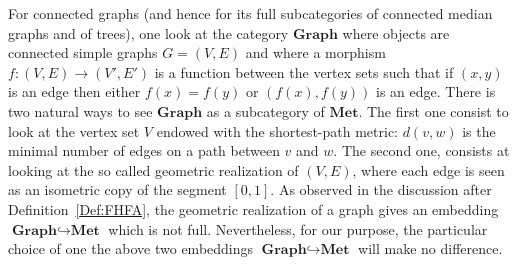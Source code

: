\documentclass[a4paper]{article}
\theoremstyle{definition}
\DeclareMathOperator\Aut{Aut}
\newcommand*{\field}[1]{\mathbf{#1}}
\newcommand*{\category}[1]{\textbf{#1}}
\newcommand*{\Z}{\field{Z}}
\newcommand*{\R}{\field{R}}
\begin{document}
For connected graphs (and hence for its full subcategories of connected median graphs and of trees), one look at the category $\category{Graph}$ where objects are connected simple graphs $G=(V,E)$ and where a morphism $f\colon (V,E)\to(V',E')$ is a function between the vertex sets such that if $(x,y)$ is an edge then either $f(x)=f(y)$ or $(f(x),f(y))$ is an edge.
There is two natural ways to see $\category{Graph}$ as a subcategory of $\category{Met}$.
The first one consist to look at the vertex set $V$ endowed with the shortest-path metric: $d(v,w)$ is the minimal number of edges on a path between $v$ and $w$.
The second one, consists at looking at the so called geometric realization of $(V,E)$, where each edge is seen as an isometric copy of the segment $[0,1]$.
As observed in the discussion after Definition~\ref{Def:FHFA}, the geometric realization of a graph gives an embedding $\category{Graph}\hookrightarrow\category{Met}$ which is not full.
Nevertheless, for our purpose, the particular choice of one the above two embeddings $\category{Graph}\hookrightarrow\category{Met}$ will make no difference.
\end{document}
